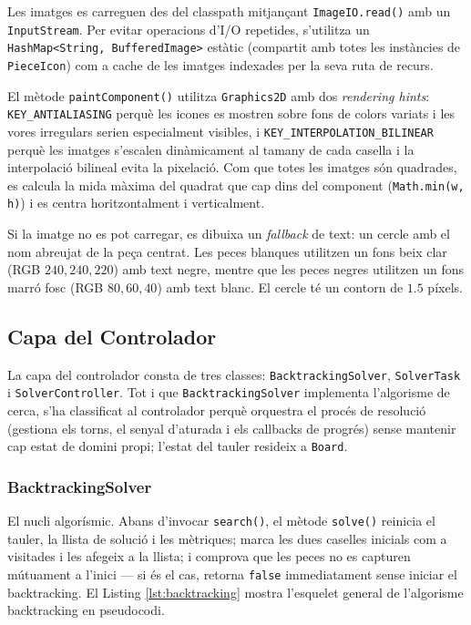 \documentclass[conference,compsoc]{IEEEtran}
\begin{document}
Les imatges es carreguen des del classpath mitjançant
\texttt{ImageIO.read()} amb un \texttt{InputStream}. Per evitar operacions
d'I/O repetides, s'utilitza un \texttt{HashMap<String, BufferedImage>}
estàtic (compartit amb totes les instàncies de \texttt{PieceIcon})
com a cache de les imatges indexades per la seva ruta de recurs.

El mètode \texttt{paintComponent()} utilitza \texttt{Graphics2D} amb
dos \textit{rendering hints}:
\texttt{KEY\_ANTIALIASING} perquè les icones es mostren sobre fons de
colors variats i les vores irregulars serien especialment visibles, i
\texttt{KEY\_INTERPOLATION\_BILINEAR} perquè les imatges s'escalen
dinàmicament al tamany de cada casella i la interpolació bilineal
evita la pixelació. Com que totes les imatges
són quadrades, es calcula la mida màxima del quadrat que cap dins del
component (\texttt{Math.min(w, h)}) i es centra horitzontalment i
verticalment.

Si la imatge no es pot carregar, es dibuixa un \textit{fallback} de text:
un cercle amb el nom abreujat de la peça centrat. Les peces blanques
utilitzen un fons beix clar (RGB $240, 240, 220$) amb text negre,
mentre que les peces negres utilitzen un fons marró fosc (RGB $80, 60, 40$)
amb text blanc. El cercle té un contorn de $1.5$ píxels.

\subsection{Capa del Controlador}

La capa del controlador consta de tres classes: \texttt{BacktrackingSolver},
\texttt{SolverTask} i \texttt{SolverController}. Tot i que
\texttt{BacktrackingSolver} implementa l'algorisme de cerca,
s'ha classificat al controlador perquè orquestra el procés de resolució
(gestiona els torns, el senyal d'aturada i els callbacks de progrés)
sense mantenir cap estat de domini propi; l'estat del tauler resideix
a \texttt{Board}.

\subsubsection{BacktrackingSolver}

El nucli algorísmic. Abans d'invocar \texttt{search()}, el mètode
\texttt{solve()} reinicia el tauler, la llista de solució i les
mètriques; marca les dues caselles inicials com a visitades i les
afegeix a la llista; i comprova que les peces no es capturen mútuament
a l'inici --- si és el cas, retorna \texttt{false} immediatament sense
iniciar el backtracking. El Listing \ref{lst:backtracking}
mostra l'esquelet general de l'algorisme backtracking en pseudocodi.
\end{document}

